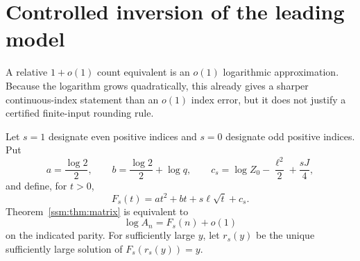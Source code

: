 \section{Controlled inversion of the leading model}\label{ssm:sec:inverse}
A relative $1+o(1)$ count equivalent is an $o(1)$ logarithmic approximation. Because the logarithm grows quadratically, this already gives a sharper continuous-index statement than an $o(1)$ index error, but it does not justify a certified finite-input rounding rule.

Let $s=1$ designate even positive indices and $s=0$ designate odd positive indices. Put
\begin{equation}\label{ssm:eq:inverseconstants}
 a=\frac{\log2}{2},\qquad b=\frac{\log2}{2}+\log q,\qquad
 c_s=\log Z_0-\frac{\ell^2}{2}+\frac{sJ}{4},
\end{equation}
and define, for $t>0$,
\begin{equation}\label{ssm:eq:Fs}
 F_s(t)=at^2+bt+s\ell\sqrt t+c_s.
\end{equation}
Theorem~\ref{ssm:thm:matrix} is equivalent to
\begin{equation}\label{ssm:eq:logerror}
 \log A_n=F_s(n)+o(1)
\end{equation}
on the indicated parity. For sufficiently large $y$, let $r_s(y)$ be the unique sufficiently large solution of $F_s(r_s(y))=y$.

